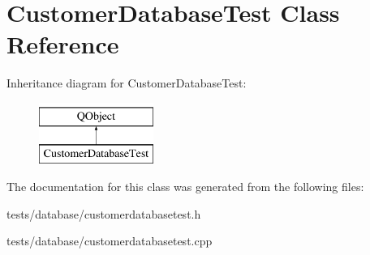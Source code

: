 \hypertarget{classCustomerDatabaseTest}{}\section{Customer\+Database\+Test Class Reference}
\label{classCustomerDatabaseTest}
Inheritance diagram for Customer\+Database\+Test\+:\begin{figure}[H]
\begin{center}
\leavevmode
\includegraphics[height=2.000000cm]{d2/d63/classCustomerDatabaseTest}
\end{center}
\end{figure}


The documentation for this class was generated from the following files\+:\begin{DoxyCompactItemize}
\item 
tests/database/customerdatabasetest.\+h\item 
tests/database/customerdatabasetest.\+cpp\end{DoxyCompactItemize}
